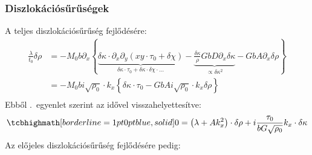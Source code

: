 \documentclass[10pt,a4paper]{scrartcl}
\begin{document}
\subsubsection{Diszlokációsűrűségek}
A teljes diszlokációsűrűség fejlődésére:
\[\begin{aligned}
  \frac{\lambda }{{{t_0}}}\delta \rho  &  =  - {M_0}b{\partial _x}\left\{ {\underbrace {\delta \kappa  \cdot {\partial _x}{\partial _y}\left( {xy \cdot {\tau _0} + \delta \chi } \right)}_{\delta \kappa  \cdot {\tau _0} + \delta \kappa  \cdot \delta \chi  \cdot  \ldots } - \underbrace {\frac{{\delta \kappa }}{\rho }GbD{\partial _x}\delta \kappa }_{ \propto \delta {\kappa ^2}} - GbA{\partial _x}\delta \rho } \right\} \\ 
   &  =  - {M_0}bi\sqrt {{\rho _0}}  \cdot {k_x}\left\{ {\delta \kappa  \cdot {\tau _0} - GbAi\sqrt {{\rho _0}}  \cdot {k_x}\delta \rho } \right\} \\ 
\end{aligned} \]
Ebből .\ egyenlet szerint az idővel visszahelyettesítve:
\begin{equation} \label{eq:lin_ed_rho}
\tcbhighmath[borderline={1pt}{0pt}{blue,solid}]{
0 = \left( {\lambda  + Ak_x^2} \right) \cdot \delta \rho  + i\frac{{{\tau _0}}}{{bG\sqrt {{\rho _0}} }}{k_x} \cdot \delta \kappa }
\end{equation}
Az előjeles diszlokációsűrűség fejlődésére pedig:
\end{document}
